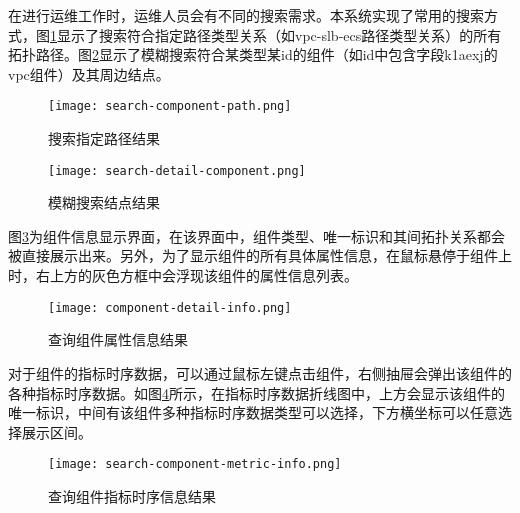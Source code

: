 在进行运维工作时，运维人员会有不同的搜索需求。本系统实现了常用的搜索方式，图\ref{search-component-path}显示了搜索符合指定路径类型关系（如vpc-slb-ecs路径类型关系）的所有拓扑路径。图\ref{search-detail-component}显示了模糊搜索符合某类型某id的组件（如id中包含字段k1aexj的vpc组件）及其周边结点。

\begin{figure}[htbp]
    \centering
    \texttt{[image: search-component-path.png]}
    \caption{搜索指定路径结果\label{search-component-path}}
\end{figure}
\begin{figure}[htbp]
    \centering
    \texttt{[image: search-detail-component.png]}
    \caption{模糊搜索结点结果\label{search-detail-component}}
\end{figure}

图\ref{component-detail-info}为组件信息显示界面，在该界面中，组件类型、唯一标识和其间拓扑关系都会被直接展示出来。另外，为了显示组件的所有具体属性信息，在鼠标悬停于组件上时，右上方的灰色方框中会浮现该组件的属性信息列表。
\begin{figure}[htbp]
    \centering
    \texttt{[image: component-detail-info.png]}
    \caption{查询组件属性信息结果\label{component-detail-info}}
\end{figure}

对于组件的指标时序数据，可以通过鼠标左键点击组件，右侧抽屉会弹出该组件的各种指标时序数据。如图\ref{search-component-metric-info}所示，在指标时序数据折线图中，上方会显示该组件的唯一标识，中间有该组件多种指标时序数据类型可以选择，下方横坐标可以任意选择展示区间。
\begin{figure}[htbp]
\centering
\texttt{[image: search-component-metric-info.png]}
\caption{查询组件指标时序信息结果\label{search-component-metric-info}}
\end{figure}


